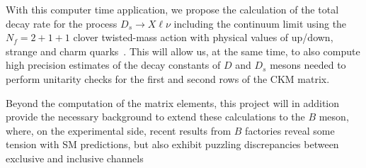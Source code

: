 With this computer time application, we propose the calculation of the total
decay rate for the process $D_s \to X\ell\nu$ including the continuum
limit using the $N_f=2+1+1$ clover twisted-mass action with physical
values of up/down, strange and charm
quarks~\cite{ExtendedTwistedMass:2021qui,ExtendedTwistedMass:2021gbo,ExtendedTwistedMass:2022jpw}.
This will allow us, at the same time, to also compute high precision
estimates of the decay constants of $D$ and $D_s$ mesons needed to
perform unitarity checks for the first and second rows of the CKM matrix.

Beyond the computation of the matrix elements, this project will
in addition provide the necessary background to extend these
calculations to the $B$ meson, where, on the experimental side, recent
results from $B$ factories reveal some tension with 
SM predictions, but also exhibit puzzling discrepancies between exclusive and inclusive
channels~\cite{ParticleDataGroup:2020ssz, HFLAV:2019otj, Gambino:2019sif}

